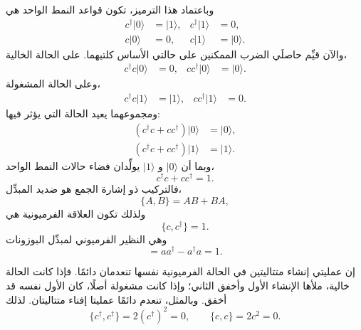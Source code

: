وباعتماد هذا الترميز، تكون قواعد النمط الواحد هي
\begin{align}
c^\dagger|0\rangle&=|1\rangle,
&c^\dagger|1\rangle&=0,
\\
c|0\rangle&=0,
&c|1\rangle&=|0\rangle.
\end{align}
والآن قيِّم حاصلَي الضرب الممكنين على حالتي الأساس كلتيهما. على الحالة الخالية،
\begin{align}
c^\dagger c|0\rangle&=0,
&
cc^\dagger|0\rangle&=|0\rangle.
\end{align}
وعلى الحالة المشغولة،
\begin{align}
c^\dagger c|1\rangle&=|1\rangle,
&
cc^\dagger|1\rangle&=0.
\end{align}
ومجموعهما يعيد الحالة التي يؤثر فيها:
\begin{align}
(c^\dagger c+cc^\dagger)|0\rangle&=|0\rangle,
\\
(c^\dagger c+cc^\dagger)|1\rangle&=|1\rangle.
\end{align}
وبما أن \(|0\rangle\) و \(|1\rangle\) يولِّدان فضاء حالات النمط الواحد،
\begin{equation}
c^\dagger c+cc^\dagger=1.
\end{equation}
فالتركيب ذو إشارة الجمع هو ضديد المبدِّل،
\begin{equation}
\{A,B\}=AB+BA,
\end{equation}
ولذلك تكون العلاقة الفرميونية هي
\begin{equation}
\{c,c^\dagger\}=1.
\end{equation}
وهي النظير الفرميوني لمبدِّل البوزونات
\begin{equation}
[a,a^\dagger]=aa^\dagger-a^\dagger a=1.
\end{equation}

إن عمليتي إنشاء متتاليتين في الحالة الفرميونية نفسها تنعدمان دائمًا. فإذا كانت الحالة خالية، ملأها الإنشاء الأول وأخفق الثاني؛ وإذا كانت مشغولة أصلًا، كان الأول نفسه قد أخفق. وبالمثل، تنعدم دائمًا عمليتا إفناء متتاليتان. لذلك
\begin{equation}
\{c^\dagger,c^\dagger\}=2(c^\dagger)^2=0,
\qquad
\{c,c\}=2c^2=0.
\end{equation}

\begin{classroomqa}
\end{classroomqa}

